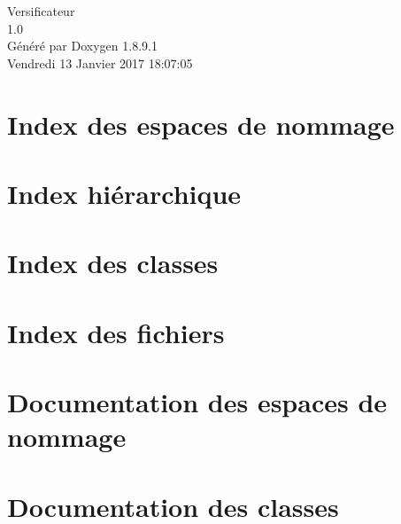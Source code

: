 \documentclass[twoside]{book}
\newcommand{\+}{\discretionary{\mbox{\scriptsize$\hookleftarrow$}}{}{}}
\newcommand{\clearemptydoublepage}{%
  \newpage{\pagestyle{empty}\cleardoublepage}%
}
\begin{document}
\hypersetup{pageanchor=false,
             bookmarks=true,
             bookmarksnumbered=true,
             pdfencoding=unicode
            }
\begin{titlepage}
\vspace*{7cm}
\begin{center}%
{\Large Versificateur \\[1ex]\large 1.\+0 }\\
\vspace*{1cm}
{\large Généré par Doxygen 1.8.9.1}\\
\vspace*{0.5cm}
{\small Vendredi 13 Janvier 2017 18:07:05}\\
\end{center}
\end{titlepage}
\clearemptydoublepage
\tableofcontents
\clearemptydoublepage
{}
\hypersetup{pageanchor=true}

\chapter{Index des espaces de nommage}

\chapter{Index hiérarchique}

\chapter{Index des classes}

\chapter{Index des fichiers}

\chapter{Documentation des espaces de nommage}















\chapter{Documentation des classes}












\end{document}
